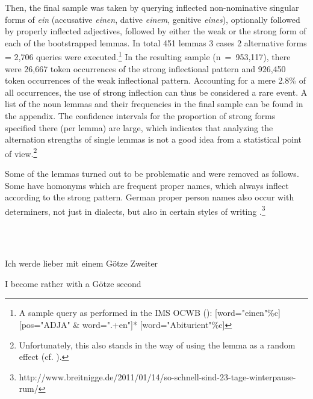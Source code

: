 \begin{styleMoutonText}
Then, the final sample was taken by querying inflected non-nominative singular forms of \textit{ein} (accusative \textit{einen}, dative \textit{einem}, genitive \textit{eines}), optionally followed by properly inflected adjectives, followed by either the weak or the strong form of each of the bootstrapped lemmas. In total 451 lemmas {\textbullet} 3 cases {\textbullet} 2 alternative forms = 2,706 queries were executed.\footnote{A sample query as performed in the IMS OCWB (\citealt{EvertHardie2011}): [word="einen"\%c] [pos="ADJA" \& word=".+en"]* [word="Abiturient"\%c]} In the resulting sample (n~=~953,117), there were 26,667 token occurrences of the strong inflectional pattern and 926,450 token occurrences of the weak inflectional pattern. Accounting for a mere 2.8\% of all occurrences, the use of strong inflection can thus be considered a rare event.\textstyleFootnoteanchor{} A list of the noun lemmas and their frequencies in the final sample can be found in the appendix. The confidence intervals for the proportion of strong forms specified there (per lemma) are large, which indicates that analyzing the alternation strengths of single lemmas is not a good idea from a statistical point of view.\footnote{Unfortunately, this also stands in the way of using the lemma as a random effect (cf. ).}
\end{styleMoutonText}

\begin{styleMoutonTextBeforeExample}
Some of the lemmas turned out to be problematic and were removed as follows. Some have homonyms which are frequent proper names, which always inflect according to the strong pattern. German proper person names also occur with determiners, not just in di\-alects, but also in certain styles of writing .\footnote{http://www.breitnigge.de/2011/01/14/so-schnell-sind-23-tage-winterpause-rum/}
\end{styleMoutonTextBeforeExample}

\begin{styleMoutonExampleSingle}
\ea%
    \label{ex:key:4}
    \gll\\
        \\
    \glt
    \z

          Ich  werde  lieber    mit   einem  Götze  Zweiter
\end{styleMoutonExampleSingle}

\begin{styleMoutonExampleAlpha}
I  become  rather    with  a    Götze  second
\end{styleMoutonExampleAlpha}

